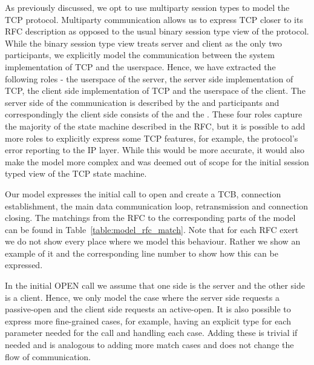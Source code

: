 
As previously discussed, we opt to use multiparty session types to model the TCP protocol.
Multiparty communication allows us to express TCP closer to its RFC description as opposed to the usual binary session type view of the protocol.
While the binary session type view treats server and client as the only two participants, we explicitly model the communication between the system implementation of TCP and the userspace.
Hence, we have extracted the following roles - the userspace of the server, the server side implementation of TCP, the client side implementation of TCP and the userspace of the client.
The server side of the communication is described by the {\serveruser} and {\serversystem} participants and correspondingly the client side  consists of the {\clientuser} and the {\clientsystem}.
These four roles capture the majority of the state machine described in the RFC, but it is possible to add more roles to explicitly express some TCP features, for example, the protocol's error reporting to the IP layer.
While this would be more accurate, it would also make the model more complex and was deemed out of scope for the initial session typed view of the TCP state machine.

Our model expresses the initial call to open and create a TCB, connection establishment, the main data communication loop, retransmission and connection closing.
The matchings from the RFC to the corresponding parts of the model can be found in Table~\ref{table:model_rfc_match}.
Note that for each RFC exert we do not show every place where we model this behaviour.
Rather we show an example of it and the corresponding line number to show how this can be expressed.

In the initial OPEN call we assume that one side is the server and the other side is a client.
Hence, we only model the case where the server side requests a passive-open and the client side requests an active-open.
It is also possible to express more fine-grained cases, for example, having an explicit type for each parameter needed for the call and handling each case.
Adding these is trivial if needed and is analogous to adding more match cases and does not change the flow of communication.

